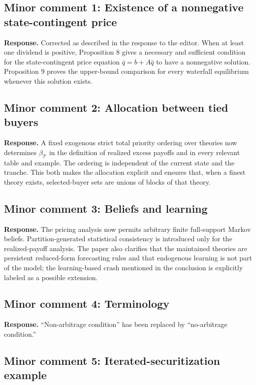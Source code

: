 \documentclass[11pt]{article}
\newcommand{\response}[1]{\par\noindent\textbf{Response.} #1\par}
\begin{document}
\subsection*{Minor comment 1: Existence of a nonnegative state-contingent price}

\response{Corrected as described in the response to the editor. When at least one dividend is positive, Proposition 8 gives a necessary and sufficient condition for the state-contingent price equation $\bar q=b+A\bar q$ to have a nonnegative solution. Proposition 9 proves the upper-bound comparison for every waterfall equilibrium whenever this solution exists.}

\subsection*{Minor comment 2: Allocation between tied buyers}

\response{A fixed exogenous strict total priority ordering over theories now determines $\beta_{\mathcal T}$ in the definition of realized excess payoffs and in every relevant table and example. The ordering is independent of the current state and the tranche. This both makes the allocation explicit and ensures that, when a finest theory exists, selected-buyer sets are unions of blocks of that theory.}

\subsection*{Minor comment 3: Beliefs and learning}

\response{The pricing analysis now permits arbitrary finite full-support Markov beliefs. Partition-generated statistical consistency is introduced only for the realized-payoff analysis. The paper also clarifies that the maintained theories are persistent reduced-form forecasting rules and that endogenous learning is not part of the model; the learning-based crash mentioned in the conclusion is explicitly labeled as a possible extension.}

\subsection*{Minor comment 4: Terminology}

\response{``Non-arbitrage condition'' has been replaced by ``no-arbitrage condition.''}

\subsection*{Minor comment 5: Iterated-securitization example}
\end{document}
